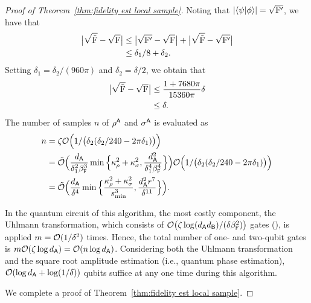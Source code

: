 \begin{proof}[Proof of Theorem~\ref{thm:fidelity est local sample}]
Noting that $|\langle \psi \vert \phi \rangle| = \sqrt{{\mathrm{F}}'}$, we have that
\begin{align}
    \big|\sqrt{\tilde{{\mathrm{F}}}} - \sqrt{{\mathrm{F}}}\big| &\leq \big|\sqrt{{\mathrm{F}}'} - \sqrt{{\mathrm{F}}}\big| + \big|\sqrt{\tilde{{\mathrm{F}}}} - \sqrt{{\mathrm{F}}'}\big| \\
    & \leq\delta_1/8 + \delta_2.
\end{align}
Setting $\delta_1 = \delta_2/(960\pi)$ and $\delta_2 = \delta/2$, we obtain that
\begin{align}
    \big|\sqrt{\tilde{{\mathrm{F}}}} - \sqrt{{\mathrm{F}}}\big| 
    &\leq \frac{1+7680\pi}{15360\pi}\delta \\
    &\leq \delta.
\end{align}
The number of samples $n$ of $\rho^{\mathsf{A}}$ and $\sigma^{\mathsf{A}}$ is evaluated as
\begin{align}
    n &= \zeta {\mathcal{O}}\Big(1/\big(\delta_2(\delta_2/240 - 2\pi \delta_1)\big)\Big) \\
    &=\tilde{{\mathcal{O}}}\Big(\frac{d_{\mathsf{A}}}{\delta_1^2\beta_{\mathtt{F}}^3}\min\Big\{\kappa_\rho^2 + \kappa_\sigma^2, \frac{d_{\mathsf{A}}^2}{\delta_1^4\beta_{\mathtt{F}}^4}\Big\}\Big){\mathcal{O}}\Big(1/\big(\delta_2(\delta_2/240 - 2\pi \delta_1)\big)\Big) \\
    &= \tilde{{\mathcal{O}}}\Big(\frac{d_{\mathsf{A}}}{\delta^4}
    \min\Big\{\frac{\kappa_\rho^2 + \kappa_\sigma^2}{s_{\rm min}^3}, \frac{d_{\mathsf{A}}^2 r^7}{\delta^{11}}\Big\}\Big).
\end{align}


In the quantum circuit of this algorithm, the most costly component, the Uhlmann transformation, which consists of ${\mathcal{O}}\big(\zeta \log(d_{\mathsf{A}} d_{\mathsf{B}})/(\delta\beta_{\mathtt{F}}^2)\big)$ gates (), is applied $m = {\mathcal{O}}(1/\delta^2)$ times. Hence, the total number of one- and two-qubit gates is $m {\mathcal{O}}(\zeta \log d_{\mathsf{A}}) = {\mathcal{O}}(n \log d_{\mathsf{A}})$.
Considering both the Uhlmann transformation and the square root amplitude estimation (i.e., quantum phase estimation), ${\mathcal{O}}(\log d_{\mathsf{A}} + \log(1/\delta))$ qubits suffice at any one time during this algorithm.



We complete a proof of Theorem~\ref{thm:fidelity est local sample}.


\end{proof}













